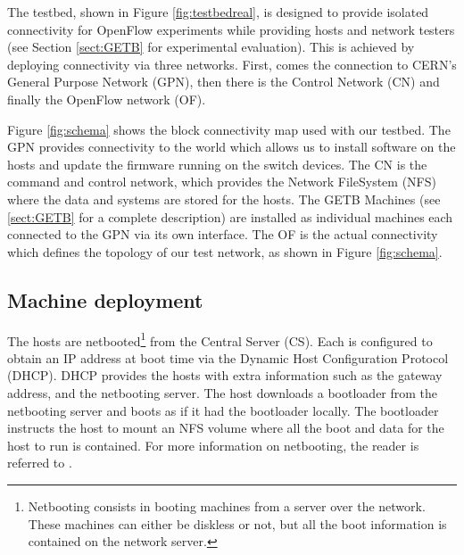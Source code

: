
The testbed, shown in Figure \ref{fig:testbedreal}, is designed to provide isolated connectivity for OpenFlow experiments while providing hosts and network testers (see
Section \ref{sect:GETB} for experimental evaluation). This is achieved by
deploying connectivity via three networks. First, comes the connection to CERN's
General Purpose Network (GPN), then there is the Control Network (CN) and
finally the OpenFlow network (OF). 





Figure \ref{fig:schema} shows the block connectivity map used with our testbed. The GPN provides connectivity to the world which allows us to install software
on the hosts and update the firmware running on the switch devices. The CN is
the command and control network, which provides the Network FileSystem
(NFS) where the data and systems are stored for the hosts. The GETB Machines (see \ref{sect:GETB} for a complete description) are installed as individual machines each connected to the GPN via its own interface. The OF is the actual connectivity which defines the topology of our test network, as shown in Figure \ref{fig:schema}.


\subsection{Machine deployment}

The hosts are netbooted\footnote{Netbooting consists in booting machines from a
server over the network. These machines can either be diskless or not, but all
the boot information is contained on the network server.} from the Central
Server (CS). Each is configured to obtain an IP address at boot time via the
Dynamic Host Configuration Protocol (DHCP). DHCP provides the hosts
with extra information such as the gateway address, and the netbooting
server. The host downloads a bootloader from the netbooting server and boots as
if it had the bootloader locally. The bootloader instructs the host to mount an
NFS volume where all the boot and data for the host to run is contained. For
more information on netbooting, the reader is referred to \cite{Netboot}.

